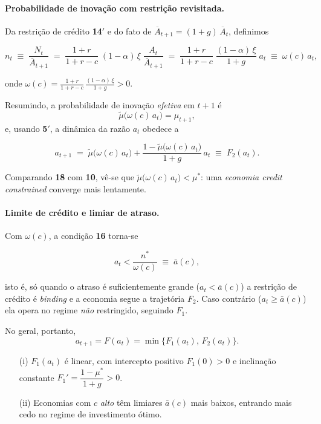 \documentclass[a4paper,12pt]{article}[abntex2]
\begin{document}
\paragraph{Probabilidade de inovação com restrição revisitada.}

Da restrição de crédito \textbf{14$'$} e do fato de $\overline{A}_{t+1}=(1+g)\,\overline{A}_t$, definimos

\[
    n_t
      \;\equiv\;
      \frac{N_t}{\overline{A}_{t+1}}
      \;=\;
      \frac{1+r}{1+r-c}\;
      (1-\alpha)\,\xi\;
      \frac{A_t}{\overline{A}_{t+1}}
      \;=\;
      \frac{1+r}{1+r-c}\;
      \frac{(1-\alpha)\,\xi}{1+g}\;
      a_t
      \;\equiv\;
      \omega(c)\,a_t,
    \tag{17}
\]

onde $\displaystyle \omega(c)=\frac{1+r}{1+r-c}\,
            \frac{(1-\alpha)\,\xi}{1+g}>0$.

Resumindo, a probabilidade de inovação \emph{efetiva} em $t+1$ é
\[
    \tilde{\mu}\bigl(\omega(c)\,a_t\bigr)=\mu_{t+1},
\]
e, usando \textbf{5$'$}, a dinâmica da razão $a_t$ obedece a

\[
    a_{t+1}
      \;=\;
      \tilde{\mu}\!\bigl(\omega(c)\,a_t\bigr)
      + \frac{1-\tilde{\mu}\!\bigl(\omega(c)\,a_t\bigr)}{1+g}\,a_t
      \;\equiv\;
      F_{2}(a_t).
    \tag{18}
\]

Comparando \textbf{18} com \textbf{10}, vê-se que
$\tilde{\mu}\bigl(\omega(c)\,a_t\bigr)<\mu^{\ast}$:  
uma \emph{economia credit constrained} converge mais lentamente.

\paragraph{Limite de crédito e limiar de atraso.}

Com $\omega(c)$, a condição \textbf{16} torna-se

\[
    a_t < \frac{n^{\ast}}{\omega(c)}
        \;\equiv\;
        \bar{a}(c),
    \tag{16$'$}
\]

isto é, só quando o atraso é suficientemente grande ($a_t<\bar a(c)$)
a restrição de crédito é \emph{binding} e a economia segue a trajetória
$F_{2}$.  Caso contrário ($a_t\ge\bar a(c)$) ela opera no regime
\textit{não} restringido, seguindo $F_{1}$.

No geral, portanto,
\[
    a_{t+1}=F(a_t)=\min\bigl\{F_{1}(a_t),\,F_{2}(a_t)\bigr\}.
\]

\begin{itemize}
    \item[(i)] $F_{1}(a_t)$ é linear, com intercepto positivo
          $F_{1}(0)>0$ e inclinação constante
          $F_{1}'=\dfrac{1-\mu^{\ast}}{1+g}>0$.
    \item[(ii)] Economias com $c$ \emph{alto} têm
          limiares $\bar{a}(c)$ mais baixos, entrando
          mais cedo no regime de investimento ótimo.
\end{itemize}
\end{document}

